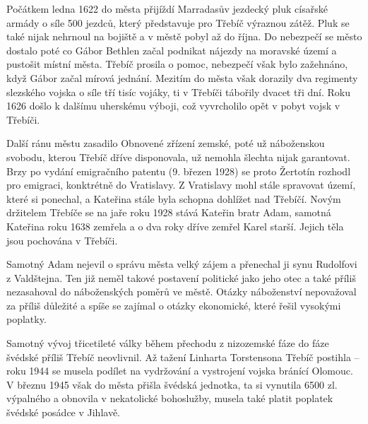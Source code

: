 \documentclass[a4paper,oneside,12p]{report}
\let\openright=\clearpage
\begin{document}
Počátkem ledna 1622 do města přijíždí Marradasův jezdecký pluk císařské armády o síle 500 jezdců, který představuje pro Třebíč výraznou zátěž.
Pluk se také nijak nehrnoul na bojiště a v městě pobyl až do října.
Do nebezpečí se město dostalo poté co Gábor Bethlen začal podnikat nájezdy na moravské území a pustošit místní města.
Třebíč prosila o pomoc, nebezpečí však bylo zažehnáno, když Gábor začal mírová jednání.
Mezitím do města však dorazily dva regimenty slezského vojska o síle tří tisíc vojáky, ti v Třebíči tábořily dvacet tři dní.
Roku 1626 došlo k dalšímu uherskému výboji, což vyvrcholilo opět v pobyt vojsk v Třebíči.

Další ránu městu zasadilo Obnovené zřízení zemské, poté už náboženskou svobodu, kterou Třebíč dříve disponovala, už nemohla šlechta nijak garantovat.
Brzy po vydání emigračního patentu (9. březen 1928) se proto Žertotín rozhodl pro emigraci, konktrétně do Vratislavy.
Z Vratislavy mohl stále spravovat území, které si ponechal, a Kateřina stále byla schopna dohlížet nad Třebíčí.
Novým držitelem Třebíče se na jaře roku 1928 stává Kateřin bratr Adam, samotná Kateřina roku 1638 zemřela a o dva roky dříve zemřel Karel starší.
Jejich těla jsou pochována v Třebíči.

Samotný Adam nejevil o správu města velký zájem a přenechal ji synu Rudolfovi z Valdštejna.
Ten již neměl takové postavení politické jako jeho otec a také příliš nezasahoval do náboženských poměrů ve městě.
Otázky náboženství nepovažoval za příliš důležité a spíše se zajímal o otázky ekonomické, které řešil vysokými poplatky.

Samotný vývoj třicetileté války během přechodu z nizozemské fáze do fáze švédské příliš Třebíč neovlivnil.
Až tažení Linharta Torstensona Třebíč postihla -- roku 1944 se musela podílet na vydržování a vystrojení vojska bránící Olomouc.
V březnu 1945 však do města přišla švédská jednotka, ta si vynutila 6500 zl. výpalného a obnovila v nekatolické bohoslužby, musela také platit poplatek švédské posádce v Jihlavě.




\listoffigures
\openright
\end{document}
